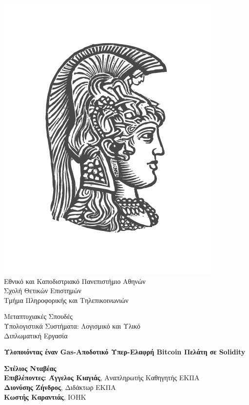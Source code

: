 \begin{center}

    \includegraphics[scale=0.8]{figures/logo_uoa.jpg}\\
    {\large Εθνικό και Καποδιστριακό Πανεπιστήμιο Αθηνών \\
    Σχολή Θετικών Επιστημών \\
    Τμήμα Πληροφορικής και Τηλεπικοινωνιών\\}
    \vspace{1cm}
    \begin{LARGE}
        Μεταπτυχιακές Σπουδές \\
        Υπολογιστικά Συστήματα: Λογισμικό και Υλικό\\
        \vspace{10mm}
        {Διπλωματική Εργασία}\\
        \vspace{0.8cm}
    \end{LARGE}
    {\textbf{\LARGE Υλοποιόντας έναν Gas-Αποδοτικό Υπερ-Ελαφρή Bitcoin Πελάτη σε Solidity}}\\
    \vspace{2.5cm}


    \textbf{\large Στέλιος Νταβέας} \\
    \vspace{2.5cm}
    \textbf{\large Επιβλέποντες: Άγγελος Κιαγιάς}\large , Αναπληρωτής Καθηγητής ΕΚΠΑ\\
    \hspace{0.82cm}
    \textbf{\large Διονύσης Ζήνδρος}\large, Διδάκτωρ ΕΚΠΑ\\
    \hspace{-1.15cm}
    \textbf{\large Κωστής Καραντιάς}\large, IOHK
    \vspace{2cm}

    \date{Αθήνα, \\ Ιούνιος 2020}
    \pagebreak
\end{center}
